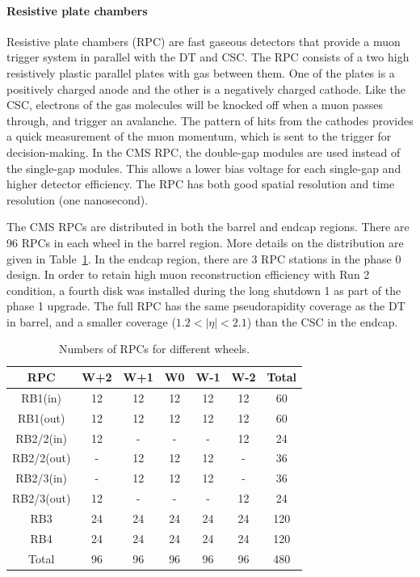 \paragraph{Resistive plate chambers}
Resistive plate chambers (RPC) are fast gaseous detectors that provide a muon trigger system in parallel with the DT and CSC. The RPC consists of a two high resistively plastic parallel plates with gas between them. One of the plates is a positively charged anode and the other is a negatively charged cathode. Like the CSC, electrons of the gas molecules will be knocked off when a muon passes through, and trigger an avalanche. The pattern of hits from the cathodes provides a quick measurement of the muon momentum, which is sent to the trigger for decision-making. In the CMS RPC, the double-gap modules are used instead of the single-gap modules. This allows a lower bias voltage for each single-gap and higher detector efficiency. The RPC has both good spatial resolution and time resolution (one nanosecond). 

The CMS RPCs are distributed in both the barrel and endcap regions. There are 96 RPCs in each wheel in the barrel region. More details on the distribution are given in Table~\ref{tab:c3cmsrpc}. In the endcap region, there are 3 RPC stations in the phase 0 design. In order to retain high muon reconstruction efficiency with Run 2 condition, a fourth disk was installed during the long shutdown 1 as part of the phase 1 upgrade. The full RPC has the same pseudorapidity coverage as the DT in barrel, and a smaller coverage ($1.2<|\eta|<2.1$) than the CSC in the endcap.

\begin{table}[htbp]
\fontsize{10 pt}{1.2 em}
\selectfont
\begin{centering}
\caption{\label{tab:c3cmsrpc} Numbers of RPCs for different wheels.}
\hspace*{-4ex}
\begin{tabular}{|c|c|c|c|c|c|c|}
\hline
 RPC &  W+2 & W+1 & W0 & W-1 & W-2 & Total \\
\hline
 RB1(in) & 12 & 12 & 12 & 12 & 12 & 60 \\
\hline
 RB1(out) & 12 & 12 & 12 & 12 & 12 & 60 \\
\hline
 RB2/2(in) & 12 & - & - & - & 12 & 24 \\
\hline
 RB2/2(out) & - & 12 & 12 & 12 & - & 36 \\
\hline
 RB2/3(in) & - & 12 & 12 & 12 & - & 36 \\
\hline
 RB2/3(out) & 12 & - & - & - & 12 & 24 \\
\hline
 RB3 & 24 & 24 & 24 & 24 & 24 & 120 \\
\hline
 RB4 & 24 & 24 & 24 & 24 & 24 & 120 \\
\hline
 Total & 96 & 96 & 96 & 96 & 96 & 480 \\
\hline
\end{tabular}
\par\end{centering}
\end{table}

